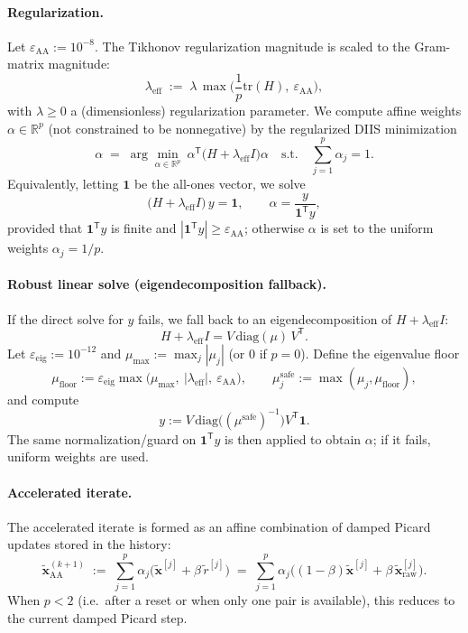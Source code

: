 \paragraph{Regularization.}
Let $\varepsilon_{\mathrm{AA}}:=10^{-8}$. The Tikhonov regularization magnitude is scaled to the Gram-matrix magnitude:
\begin{equation}\label{eq:aa-reg}
\lambda_{\mathrm{eff}} \;:=\; \lambda\,\max\!\Big(\frac{1}{p}\mathrm{tr}(H),\ \varepsilon_{\mathrm{AA}}\Big),
\end{equation}
with $\lambda\ge 0$ a (dimensionless) regularization parameter. We compute affine weights $\alpha\in\mathbb{R}^p$ (not constrained to be nonnegative) by the regularized DIIS minimization
\begin{equation}\label{eq:aa-weights}
\alpha \;=\; \arg\min_{\alpha\in\mathbb{R}^p}\ \alpha^{\mathsf{T}}\!\big(H+\lambda_{\mathrm{eff}}I\big)\alpha
\quad\text{s.t.}\quad \sum_{j=1}^p \alpha_j = 1.
\end{equation}
Equivalently, letting $\mathbf{1}$ be the all-ones vector, we solve
\[
\big(H+\lambda_{\mathrm{eff}}I\big)\,y=\mathbf{1},
\qquad \alpha = \frac{y}{\mathbf{1}^{\mathsf{T}}y},
\]
provided that $\mathbf{1}^{\mathsf{T}}y$ is finite and $|\mathbf{1}^{\mathsf{T}}y|\ge \varepsilon_{\mathrm{AA}}$; otherwise $\alpha$ is set to the uniform weights $\alpha_j=1/p$.

\paragraph{Robust linear solve (eigendecomposition fallback).}
If the direct solve for $y$ fails, we fall back to an eigendecomposition of $H+\lambda_{\mathrm{eff}}I$:
\[
H+\lambda_{\mathrm{eff}}I = V\,\mathrm{diag}(\mu)\,V^{\mathsf{T}}.
\]
Let $\varepsilon_{\mathrm{eig}}:=10^{-12}$ and $\mu_{\max}:=\max_j|\mu_j|$ (or $0$ if $p=0$).
Define the eigenvalue floor
\[
\mu_{\mathrm{floor}} := \varepsilon_{\mathrm{eig}}\max\!\big(\mu_{\max},\ |\lambda_{\mathrm{eff}}|,\ \varepsilon_{\mathrm{AA}}\big),
\qquad 
\mu_j^{\mathrm{safe}} := \max(\mu_j,\mu_{\mathrm{floor}}),
\]
and compute
\[
y := V\,\mathrm{diag}\big((\mu^{\mathrm{safe}})^{-1}\big)V^{\mathsf{T}}\mathbf{1}.
\]
The same normalization/guard on $\mathbf{1}^{\mathsf{T}}y$ is then applied to obtain $\alpha$; if it fails, uniform weights are used.

\paragraph{Accelerated iterate.}
The accelerated iterate is formed as an affine combination of damped Picard updates stored in the history:
\begin{equation}\label{eq:aa-update}
\widetilde{\mathbf{x}}_{\mathrm{AA}}^{(k+1)} \;:=\;
\sum_{j=1}^p \alpha_j\Big(\widetilde{\mathbf{x}}^{[j]} + \beta\,\widetilde{r}^{[j]}\Big)
\;=\;
\sum_{j=1}^p \alpha_j\Big((1-\beta)\widetilde{\mathbf{x}}^{[j]} + \beta\,\widetilde{\mathbf{x}}_{\mathrm{raw}}^{[j]}\Big).
\end{equation}
When $p<2$ (i.e.\ after a reset or when only one pair is available), this reduces to the current damped Picard step.

